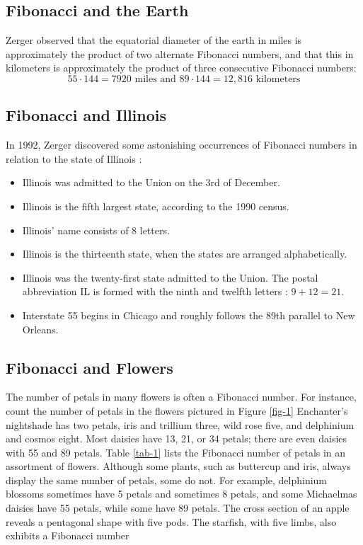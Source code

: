 \documentclass[10pt]{report}
\begin{document}
{\subsection{Fibonacci and the Earth}

Zerger observed that the equatorial diameter of the earth in miles is approximately the product of two alternate Fibonacci numbers, and that this in kilometers is approximately the product of three consecutive
Fibonacci numbers: 
$$55 \cdot 144 = 7920 \mbox{ miles and }   89 \cdot 144 = 12,816 \mbox{ kilometers} $$

\subsection{Fibonacci and Illinois}
In 1992, Zerger discovered some astonishing occurrences of Fibonacci numbers in relation to the state of Illinois :
\begin{itemize}
 \item Illinois was admitted to the Union on the 3rd of December.
 \item Illinois is the fifth largest state, according to the 1990 census.
 \item Illinois' name consists of 8 letters.
 \item Illinois is the thirteenth state, when the states are arranged alphabetically.
 \item Illinois was the twenty-first state admitted to the Union. The postal abbreviation
IL is formed with the ninth and twelfth letters : $9 + 12 = 21$.
 \item Interstate 55 begins in Chicago and roughly follows the 89th parallel to New Orleans.
\end{itemize}

\subsection{Fibonacci and Flowers}
The number of petals in many flowers is often a Fibonacci number. For instance, count the number of petals in the flowers pictured in Figure \ref{fig-1} Enchanter's nightshade has two petals, iris and trillium three, wild rose five, and delphinium and cosmos eight. Most daisies have 13, 21, or 34 petals; there are even daisies with 55 and 89 petals. Table \ref{tab-1} lists the Fibonacci number of petals in an assortment of flowers. Although some plants, such as buttercup and iris, always display the same number of petals, some do not. For example, delphinium blossoms sometimes have 5 petals and
sometimes 8 petals, and some Michaelmas daisies have 55 petals, while some have 89 petals. The cross section of an apple reveals a pentagonal shape with five pods. The starfish, with five limbs, also exhibits a Fibonacci number

}
\end{document}
